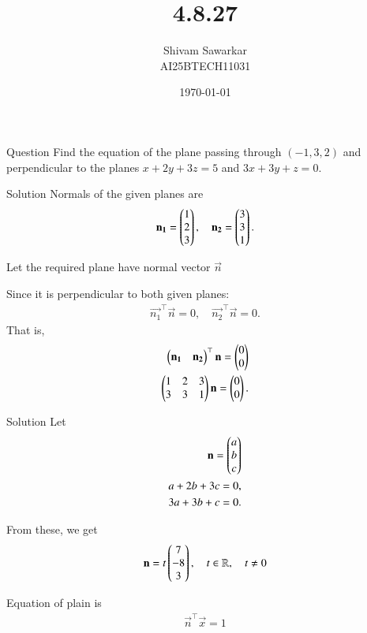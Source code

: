\documentclass{beamer}
\title %
{4.8.27}
\date{\today}
\author %
{Shivam Sawarkar \\ AI25BTECH11031}
\begin{document}
\frame{\titlepage}
\begin{frame}{Question}
    Find the equation of the plane passing through $(-1, 3, 2)$ and perpendicular to the planes $x + 2y + 3z = 5$ and $3x + 3y + z = 0$.
\end{frame}

\begin{frame}{Solution}
    Normals of the given planes are
\begin{align}
\mathbf{n_1} = \begin{pmatrix}1 \\ 2 \\ 3\end{pmatrix},
\quad
\mathbf{n_2} = \begin{pmatrix}3 \\ 3 \\ 1\end{pmatrix}.
\end{align}

Let the required plane have normal vector $\vec{n}$

Since it is perpendicular to both given planes:
\begin{align}
\vec{n_1}^\top \vec{n} = 0,
\quad
\vec{n_2}^\top \vec{n} = 0.
\end{align}
That is,
\begin{align}
\begin{pmatrix}\mathbf{n_1} & \mathbf{n_2}\end{pmatrix}^\top\mathbf{n}=\begin{pmatrix}0 \\ 0\end{pmatrix} \\ 
\begin{pmatrix}
1 & 2 & 3 \\
3 & 3 & 1
\end{pmatrix}
\mathbf{n}
=
\begin{pmatrix}
0 \\ 0
\end{pmatrix}.
\end{align}
\end{frame}

\begin{frame}{Solution}
    Let
\begin{align}
\mathbf{n} = \begin{pmatrix}a \\ b \\ c\end{pmatrix} \\ 
a + 2b + 3c = 0, \\
3a + 3b + c = 0.
\end{align}

From these, we get
\begin{align}
\mathbf{n} = t \begin{pmatrix}7 \\ -8 \\ 3\end{pmatrix}, \quad t \in \mathbb{R}, \quad t \neq 0
\end{align}

Equation of plain is 
\begin{align}
    \vec{n}^\top\vec{x}=1
\end{align}
\end{frame}
\end{document}
